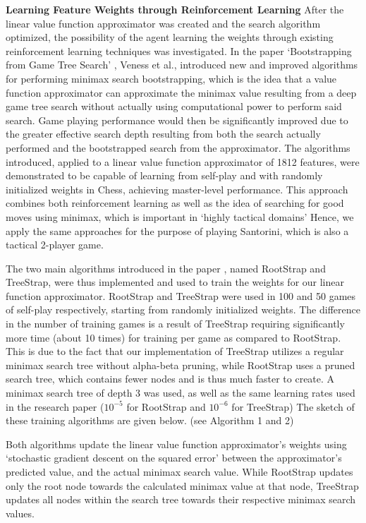 \documentclass[a4paper,12pt,table]{article}
\begin{document}
\textbf{Learning Feature Weights through Reinforcement Learning}
\newline
After the linear value function approximator was created and the search algorithm optimized, the possibility of the agent learning the weights through existing reinforcement learning techniques was investigated. In the paper ‘Bootstrapping from Game Tree Search’ \cite{Bootstrapping from Game Tree Search}, Veness et al., introduced new and improved algorithms for performing minimax search bootstrapping, which is the idea that a value function approximator can approximate the minimax value resulting from a deep game tree search without actually using computational power to perform said search. Game playing performance would then be significantly improved due to the greater effective search depth resulting from both the search actually performed and the bootstrapped search from the approximator. The algorithms introduced, applied to a linear value function approximator of 1812 features, were demonstrated to be capable of learning from self-play and with randomly initialized weights in Chess, achieving master-level performance.  This approach combines both reinforcement learning as well as the idea of searching for good moves using minimax, which is important in ‘highly tactical domains’ Hence, we apply the same approaches for the purpose of playing Santorini, which is also a tactical 2-player game. \par

The two main algorithms introduced in the paper \cite{Bootstrapping from Game Tree Search}, named RootStrap and TreeStrap, were thus implemented and used to train the weights for our linear function approximator. RootStrap and TreeStrap were used in 100 and 50 games of self-play respectively, starting from randomly initialized weights. The difference in the number of training games is a result of TreeStrap requiring significantly more time (about 10 times) for training per game as compared to RootStrap. This is due to the fact that our implementation of TreeStrap utilizes a regular minimax search tree without alpha-beta pruning, while RootStrap uses a pruned search tree, which contains fewer nodes and is thus much faster to create. A minimax search tree of depth 3 was used, as well as the same learning rates used in the research paper ($10^{-5}$ for RootStrap and $10^{-6}$ for TreeStrap) The sketch of these training algorithms are given below. (see Algorithm 1 and 2) \par

Both algorithms update the linear value function approximator’s weights using ‘stochastic gradient descent on the squared error’ between the approximator’s predicted value, and the actual minimax search value. While RootStrap updates only the root node towards the calculated minimax value at that node, TreeStrap updates all nodes within the search tree towards their respective minimax search values. \par
\end{document}
